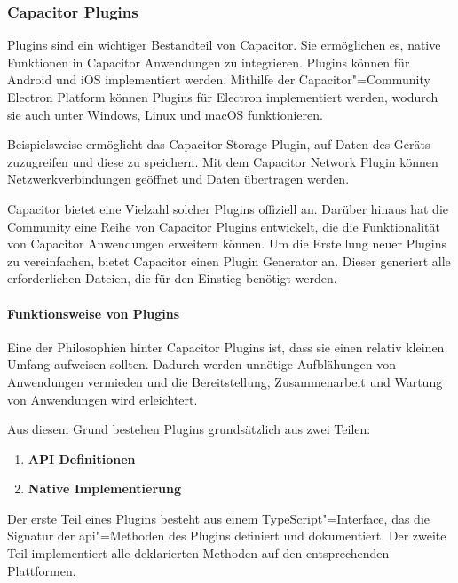 \subsubsection{Capacitor Plugins}

Plugins sind ein wichtiger Bestandteil von Capacitor.
Sie ermöglichen es, native Funktionen in Capacitor Anwendungen zu integrieren.
Plugins können für Android und iOS implementiert werden.
Mithilfe der Capacitor"=Community Electron Platform können Plugins für Electron implementiert werden, wodurch sie auch unter Windows, Linux und macOS funktionieren.
\cite{capacitor:docs, capacitor-electron}

Beispielsweise ermöglicht das Capacitor Storage Plugin, auf Daten des Geräts zuzugreifen und diese zu speichern.
Mit dem Capacitor Network Plugin können Netzwerkverbindungen geöffnet und Daten übertragen werden.
\cite{capacitor:plugins}

Capacitor bietet eine Vielzahl solcher Plugins offiziell an.
Darüber hinaus hat die Community eine Reihe von Capacitor Plugins entwickelt, die die Funktionalität von Capacitor Anwendungen erweitern können.
Um die Erstellung neuer Plugins zu vereinfachen, bietet Capacitor einen Plugin Generator an.
Dieser generiert alle erforderlichen Dateien, die für den Einstieg benötigt werden.
\cite{capacitor:docs}

\newpage

\paragraph{Funktionsweise von Plugins}

Eine der Philosophien hinter Capacitor Plugins ist, dass sie einen relativ kleinen Umfang aufweisen sollten.
Dadurch werden unnötige Aufblähungen von Anwendungen vermieden und die Bereitstellung, Zusammenarbeit und Wartung von Anwendungen wird erleichtert.
\cite{capacitor:docs}

Aus diesem Grund bestehen Plugins grundsätzlich aus zwei Teilen:

\begin{enumerate}
  \setlength\itemsep{-0.8em}
  \item \textbf{API Definitionen} 
  \item \textbf{Native Implementierung}
\end{enumerate}

Der erste Teil eines Plugins besteht aus einem TypeScript"=Interface, das die Signatur der \acs{api}"=Methoden des Plugins definiert und dokumentiert.
Der zweite Teil implementiert alle deklarierten Methoden auf den entsprechenden Plattformen.
\cite{capacitor:docs}

